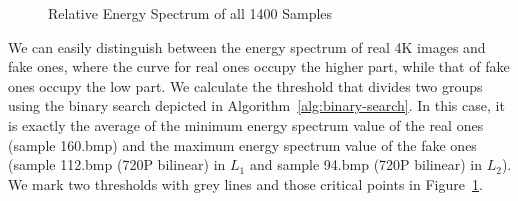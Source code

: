 \documentclass[journal,conference]{IEEEtran}
\begin{document}
\begin{figure}[h]
	\centering
	\begin{minipage}{0.95\linewidth}
	\end{minipage}
	\begin{minipage}{0.95\linewidth}
	\end{minipage}
	\caption{Relative Energy Spectrum of all 1400 Samples}
	\label{fig:rel-energy-spec}
\end{figure}

We can easily distinguish between the energy spectrum of real 4K images and fake ones, where the curve for real ones occupy the higher part, while that of fake ones occupy the low part.
We calculate the threshold that divides two groups using the binary search depicted in Algorithm~\ref{alg:binary-search}.
In this case, it is exactly the average of the minimum energy spectrum value of the real ones (sample 160.bmp) and the maximum energy spectrum value of the fake ones (sample 112.bmp (720P bilinear) in $L_1$ and sample 94.bmp (720P bilinear) in $L_2$).
We mark two thresholds with grey lines and those critical points in Figure~\ref{fig:rel-energy-spec}.
\end{document}
